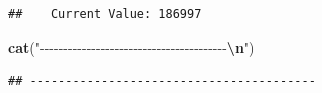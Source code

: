 \documentclass[
]{article}
\newenvironment{Shaded}{\begin{snugshade}}{\end{snugshade}}
\newcommand{\FunctionTok}[1]{\textcolor[rgb]{0.13,0.29,0.53}{\textbf{#1}}}
\newcommand{\NormalTok}[1]{#1}
\newcommand{\SpecialCharTok}[1]{\textcolor[rgb]{0.81,0.36,0.00}{\textbf{#1}}}
\newcommand{\StringTok}[1]{\textcolor[rgb]{0.31,0.60,0.02}{#1}}
\begin{document}
\begin{verbatim}
##    Current Value: 186997
\end{verbatim}

\begin{Shaded}
\begin{Highlighting}[]
\FunctionTok{cat}\NormalTok{(}\StringTok{"{-}{-}{-}{-}{-}{-}{-}{-}{-}{-}{-}{-}{-}{-}{-}{-}{-}{-}{-}{-}{-}{-}{-}{-}{-}{-}{-}{-}{-}{-}{-}{-}{-}{-}{-}{-}{-}{-}{-}{-}}\SpecialCharTok{\textbackslash{}n}\StringTok{"}\NormalTok{)}
\end{Highlighting}
\end{Shaded}

\begin{verbatim}
## ----------------------------------------
\end{verbatim}
\end{document}
